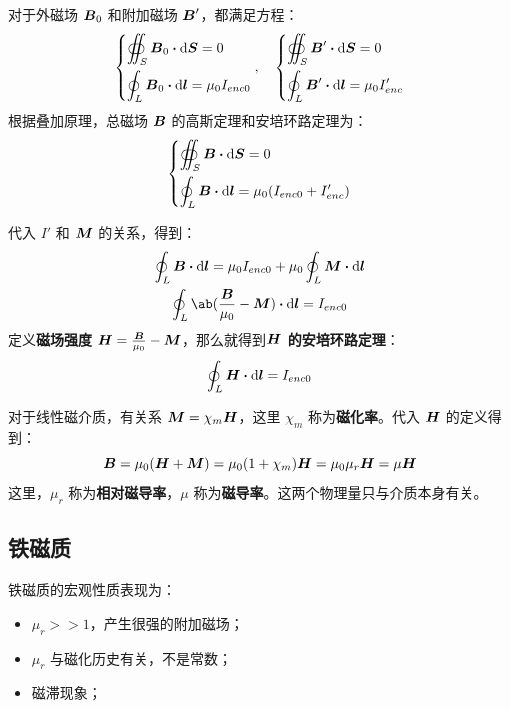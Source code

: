 对于外磁场 $\boldsymbol{B}_0$ 和附加磁场 $\boldsymbol{B}'$，都满足方程：
$$
\begin{dcases}
	\oiint_S \vect{B}_0 \vdot \dd{\vect{S}} = 0 \\
	\oint_L \vect{B}_0 \vdot \dd{\vect{l}} = \mu_0 I_{enc0}
\end{dcases},\quad \begin{dcases}
	\oiint_S \vect{B}' \vdot \dd{\vect{S}} = 0 \\
	\oint_L \vect{B}' \vdot \dd{\vect{l}} = \mu_0 I_{enc}'
\end{dcases}
$$
根据叠加原理，总磁场 $\boldsymbol{B}$ 的高斯定理和安培环路定理为：
$$
\begin{dcases}
	\oiint_S \vect{B} \vdot \dd{\vect{S}} = 0 \\
	\oint_L \vect{B} \vdot \dd{\vect{l}} = \mu_0 (I_{enc0} + I_{enc}')
\end{dcases}
$$

代入 $I'$ 和 $\boldsymbol{M}$ 的关系，得到：
$$
\begin{gathered}
	\oint_L \vect{B} \vdot \dd{\vect{l}} = \mu_0 I_{enc0} + \mu_0 \oint_L \vect{M} \vdot \dd{\vect{l}} \\
	\oint_L \ab(\frac{\vect{B}}{\mu_0} - \vect{M}) \vdot \dd{\vect{l}} = I_{enc0}
\end{gathered}
$$
定义\textbf{磁场强度} $\boldsymbol{H} = \frac{\boldsymbol{B}}{\mu_0} - \boldsymbol{M}$，那么就得到\textbf{$\boldsymbol{H}$ 的安培环路定理}：
$$
\oint_L \vect{H} \vdot \dd{\vect{l}} = I_{enc0}
$$

对于线性磁介质，有关系 $\boldsymbol{M} = \chi_m \boldsymbol{H}$，这里 $\chi_m$ 称为\textbf{磁化率}。代入 $\boldsymbol{H}$ 的定义得到：
$$
\boldsymbol{B} = \mu_0 (\boldsymbol{H} + \boldsymbol{M}) = \mu_0 (1 + \chi_m) \boldsymbol{H} = \mu_0 \mu_r \boldsymbol{H} = \mu \boldsymbol{H}
$$
这里，$\mu_r$ 称为\textbf{相对磁导率}，$\mu$ 称为\textbf{磁导率}。这两个物理量只与介质本身有关。

\subsection{铁磁质}

铁磁质的宏观性质表现为：

\begin{itemize}
	\item $\mu_r >> 1$，产生很强的附加磁场；
	\item $\mu_r$ 与磁化历史有关，不是常数；
	\item 磁滞现象；
\end{itemize}